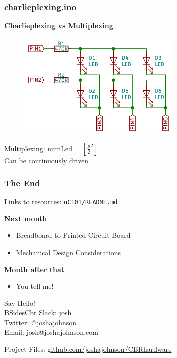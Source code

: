 \documentclass[t]{beamer}
\begin{document}

\begin{frame}[t]
\frametitle{charlieplexing.ino}
\textbf{Charlieplexing vs Multiplexing}

\begin{figure}
	\includegraphics[width=0.7\textwidth]{multiPlexing.PNG}
\end{figure}
\centering
Multiplexing: numLed = $\left \lfloor{\frac{p}{2}^2}\right \rfloor$ \\
Can be continuously driven 

\end{frame}



\begin{frame}
\frametitle{The End}
Links to resources: \texttt{uC101/README.md}
\vspace{5mm}

\textbf{Next month}
\begin{itemize}
	\item Breadboard to Printed Circuit Board
	\item Mechanical Design Considerations	
\end{itemize}
\vspace{3mm}
\textbf{Month after that}
\begin{itemize}
	\item You tell me! 	
\end{itemize}

\vspace{5mm}
Say Hello! \\
BSidesCbr Slack: josh\\
Twitter:  @\textunderscore joshajohnson\\
Email: josh@joshajohnson.com\\
\vspace{4mm}

Project Files: \url{github.com/joshajohnson/CBRhardware}\\\end{frame}
\end{document}
